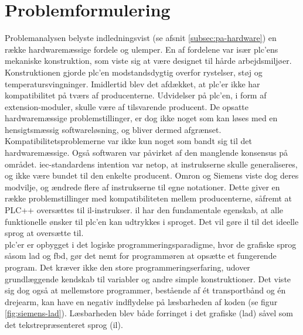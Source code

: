 \section{Problemformulering}
\label{sec:problemformulering}
Problemanalysen belyste indledningsvist (se afsnit \ref{subsec:pa-hardware}) en række hardwaremæssige fordele og ulemper. En af fordelene var især \gls{plc}'ens mekaniske konstruktion, som viste sig at være designet til hårde arbejdsmiljøer. Konstruktionen gjorde \gls{plc}'en modstandsdygtig overfor rystelser, støj og temperatursvingninger. Imidlertid blev det afdækket, at \gls{plc}'er ikke har kompatibilitet på tværs af producenterne. Udvidelser på \gls{plc}'en, i form af extension-moduler, skulle være af tilsvarende producent. De opsatte hardwaremæssige problemstillinger, er dog ikke noget som kan løses med en hensigtsmæssig softwareløsning, og bliver dermed afgrænset. \\ 

\noindent Kompatibilitetsproblemerne var ikke kun noget som bandt sig til det hardwaremæssige. Også softwaren var påvirket af den manglende konsensus på området. \gls{iec}-standardens intention var netop, at instrukserne skulle generaliseres, og ikke være bundet til den enkelte producent. Omron og Siemens viste dog deres modvilje, og ændrede flere af instrukserne til egne notationer. Dette giver en række problemstillinger med kompatibiliteten mellem producenterne, såfremt at PLC++ oversættes til \gls{il}-instrukser. \gls{il} har den fundamentale egenskab, at alle funktionelle ønsker til \gls{plc}'en kan udtrykkes i sproget. Det vil gøre \gls{il} til det ideelle sprog at oversætte til. \\

\noindent \gls{plc}'er er opbygget i det logiske programmeringsparadigme, hvor de grafiske sprog såsom \gls{lad} og \gls{fbd}, gør det nemt for programmøren at opsætte et fungerende program. Det kræver ikke den store programmeringserfaring, udover grundlæggende kendskab til variabler og andre simple konstruktioner. Det viste sig dog også at mellemstore programmer, bestående af ét transportbånd og én drejearm, kan have en negativ indflydelse på læsbarheden af koden (se figur \ref{fig:siemens-lad}). Læsbarheden blev både forringet i det grafiske (\gls{lad}) såvel som det tekstrepræsenteret sprog (\gls{il}). \\

